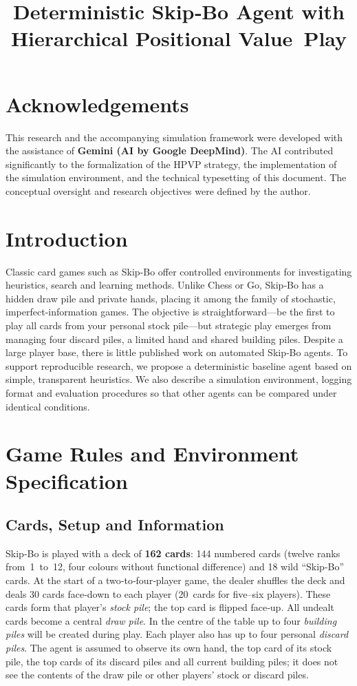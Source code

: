 \documentclass[twoside]{mitthesis}
\title{Deterministic Skip‑Bo Agent with Hierarchical Positional Value Play}
\begin{document}
\maketitle



\chapter*{Acknowledgements}
This research and the accompanying simulation framework were developed with the assistance of \textbf{Gemini (AI by Google DeepMind)}. The AI contributed significantly to the formalization of the HPVP strategy, the implementation of the simulation environment, and the technical typesetting of this document. The conceptual oversight and research objectives were defined by the author.

\tableofcontents

\chapter{Introduction}
Classic card games such as Skip‑Bo offer controlled environments for investigating heuristics, search and learning methods.  Unlike Chess or Go, Skip‑Bo has a hidden draw pile and private hands, placing it among the family of stochastic, imperfect‑information games.  The objective is straightforward—be the first to play all cards from your personal stock pile—but strategic play emerges from managing four discard piles, a limited hand and shared building piles.  Despite a large player base, there is little published work on automated Skip‑Bo agents.  To support reproducible research, we propose a deterministic baseline agent based on simple, transparent heuristics.  We also describe a simulation environment, logging format and evaluation procedures so that other agents can be compared under identical conditions.

\chapter{Game Rules and Environment Specification}
\section{Cards, Setup and Information}
Skip‑Bo is played with a deck of \textbf{162 cards}: 144 numbered cards (twelve ranks from 1 to 12, four colours without functional difference) and 18 wild ``Skip‑Bo'' cards.  At the start of a two‑to‑four‑player game, the dealer shuffles the deck and deals 30 cards face‑down to each player (20 cards for five–six players).  These cards form that player's \emph{stock pile}; the top card is flipped face‑up.  All undealt cards become a central \emph{draw pile}.  In the centre of the table up to four \emph{building piles} will be created during play.  Each player also has up to four personal \emph{discard piles}.  The agent is assumed to observe its own hand, the top card of its stock pile, the top cards of its discard piles and all current building piles; it does not see the contents of the draw pile or other players' stock or discard piles.
\end{document}
